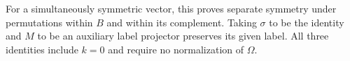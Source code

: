 For a simultaneously symmetric vector, this proves separate symmetry under
permutations within $B$ and within its complement. Taking $\sigma$ to be the
identity and $M$ to be an auxiliary label projector preserves its given label.
All three identities include $k=0$ and require no normalization of $\Omega$.
